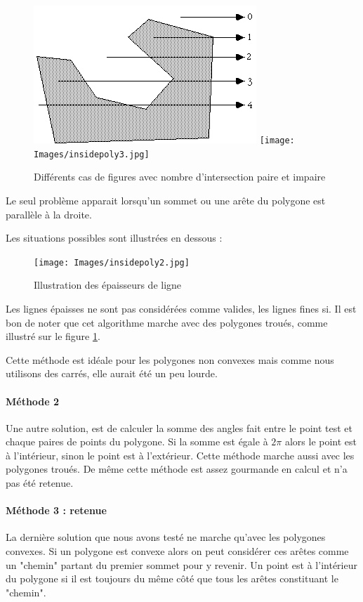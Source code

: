 \documentclass[a4paper,12pt]{report}
\begin{document}
\begin{figure}[h]
\centering
\includegraphics[scale=0.6]{Images/insidepoly1.jpg}
\texttt{[image: Images/insidepoly3.jpg]}
\caption{Différents cas de figures avec nombre d'intersection paire et impaire}
\label{nbintersect}
\end{figure}
\vspace{0.5cm}

Le seul problème apparait lorsqu'un sommet ou une arête du polygone est parallèle à la droite.

Les situations possibles sont illustrées en dessous :

\begin{figure}[h]
\centering
\texttt{[image: Images/insidepoly2.jpg]}
\caption{Illustration des épaisseurs de ligne}
\end{figure}
\vspace{0.5cm}

Les lignes épaisses ne sont pas considérées comme valides, les lignes fines si.
Il est bon de noter que cet algorithme marche avec des polygones troués, comme illustré sur le figure \ref{nbintersect}.

Cette méthode est idéale pour les polygones non convexes mais comme nous utilisons des carrés, elle aurait été un peu lourde.

\paragraph{Méthode 2 }
Une autre solution, est de calculer la somme des angles fait entre le point test et chaque paires de points du polygone. Si la somme est égale à $2\pi$ alors le point est à l'intérieur, sinon le point est à l'extérieur. 
Cette méthode marche aussi avec les polygones troués.
De même cette méthode est assez gourmande en calcul et n'a pas été retenue.

\paragraph{Méthode 3 : retenue}
La dernière solution que nous avons testé ne marche qu'avec les polygones convexes. Si un polygone est convexe alors on peut considérer ces arêtes comme un "chemin" partant du premier sommet pour y revenir. 
Un point est à l'intérieur du polygone si il est toujours du même côté que tous les arêtes constituant le "chemin".
\end{document}
